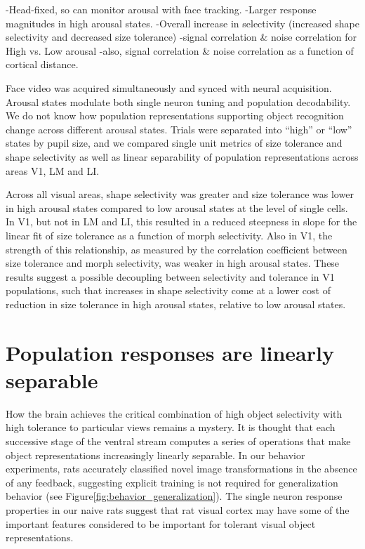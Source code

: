 -Head-fixed, so can monitor arousal with face tracking.
-Larger response magnitudes in high arousal states.
-Overall increase in selectivity (increased shape selectivity and decreased size tolerance)
-signal correlation & noise correlation for High vs. Low arousal
-also, signal correlation & noise correlation as a function of cortical distance. 

Face video was acquired simultaneously and synced with neural acquisition. Arousal states modulate both single neuron tuning and population decodability. We do not know how population representations supporting object recognition change across different arousal states. Trials were separated into “high” or “low” states by pupil size, and we compared single unit metrics of size tolerance and shape selectivity as well as linear separability of population representations across areas V1, LM and LI. 

Across all visual areas, shape selectivity was greater and size tolerance was lower in high arousal states compared to low arousal states at the level of single cells. In V1, but not in LM and LI, this resulted in a reduced steepness in slope for the linear fit of size tolerance as a function of morph selectivity. Also in V1, the strength of this relationship, as measured by the correlation coefficient between size tolerance and morph selectivity, was weaker in high arousal states. These results suggest a possible decoupling between selectivity and tolerance in V1 populations, such that increases in shape selectivity come at a lower cost of reduction in size tolerance in high arousal states, relative to low arousal states.

\section{Population responses are linearly separable}
How the brain achieves the critical combination of high object selectivity with high tolerance to particular views remains a mystery. It is thought that each successive stage of the ventral stream computes a series of operations that make object representations increasingly linearly separable. In our behavior experiments, rats accurately classified novel image transformations in the absence of any feedback, suggesting explicit training is not required for generalization behavior (see Figure\ref{fig:behavior_generalization}). The single neuron response properties in our naive rats suggest that rat visual cortex may have some of the important features considered to be important for tolerant visual object representations.

